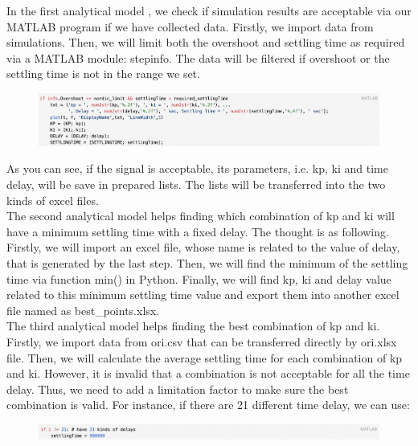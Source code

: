 \documentclass{report}
\begin{document}
In the first analytical model , we check if simulation results are acceptable via our MATLAB program if we have collected data. Firstly, we import data from simulations. Then, we will limit both the overshoot and settling time as required via a MATLAB module: stepinfo. The data will be filtered if overshoot or the settling time is not in the range we set.\\

\begin{figure}[htbp]
\centering
\includegraphics[width = \textwidth]{figure/3_4_2_code5.png}
\label{3_4_2_code5}
\end{figure}


As you can see, if the signal is acceptable, its parameters, i.e. kp, ki and time delay, will be save in prepared lists. The lists will be transferred into the two kinds of excel files.\\

The second analytical model helps finding which combination of kp and ki will have a minimum settling time with a fixed delay. The thought is as following. Firstly, we will import an excel file, whose name is related to the value of delay,  that is generated by the last step. Then, we will find the minimum of the settling time via function min() in Python. Finally, we will find kp, ki and delay value related to this minimum settling time value and export them into another excel file named as best\_points.xlsx.\\

The third analytical model helps finding the best combination of kp and ki. Firstly, we import data from ori.csv that can be transferred directly by ori.xlsx file. Then, we will calculate the average settling time for each combination of kp and ki. However, it is invalid that a combination is not acceptable for all the time delay. Thus, we need to add a limitation factor to make sure the best combination is valid. For instance, if there are 21 different time delay, we can use:\\

\begin{figure}[htbp]
\centering
\includegraphics[width = \textwidth]{figure/3_4_2_code6.png}
\label{3_4_2_code6}
\end{figure}
\end{document}
